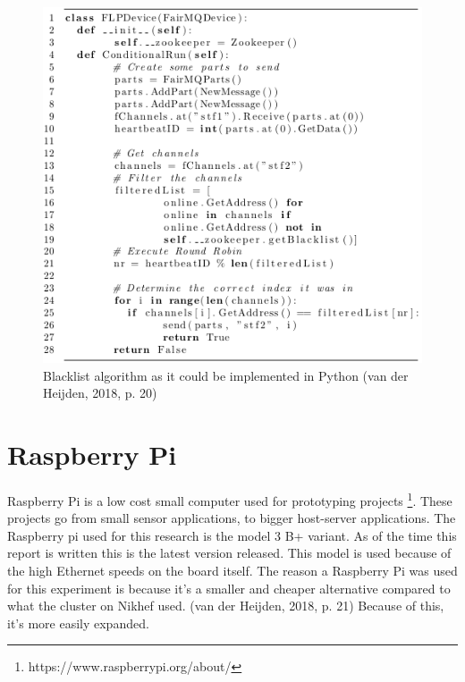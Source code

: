 \begin{figure}[htb]
	\centering
	\includegraphics[scale=0.7]{./graphics/BlacklistAlgorithm.png}
	\caption{Blacklist algorithm as it could be implemented in Python (van der Heijden, 2018, p. 20)}
	\label{fig:BlacklistAlgorithm}
\end{figure}


\section{Raspberry Pi}
Raspberry Pi is a  low cost small computer used for prototyping projects \footnote{https://www.raspberrypi.org/about/}. These projects go from small sensor applications, to bigger host-server applications. The Raspberry pi used for this research is the model 3 B+ variant. As of the time this report is written this is the latest version released. This model is used because of the high Ethernet speeds on the board itself. The reason a Raspberry Pi was used for this experiment is because it's a smaller and cheaper alternative compared to what the cluster on Nikhef used. (van der Heijden, 2018, p. 21) Because of this, it's more easily expanded.